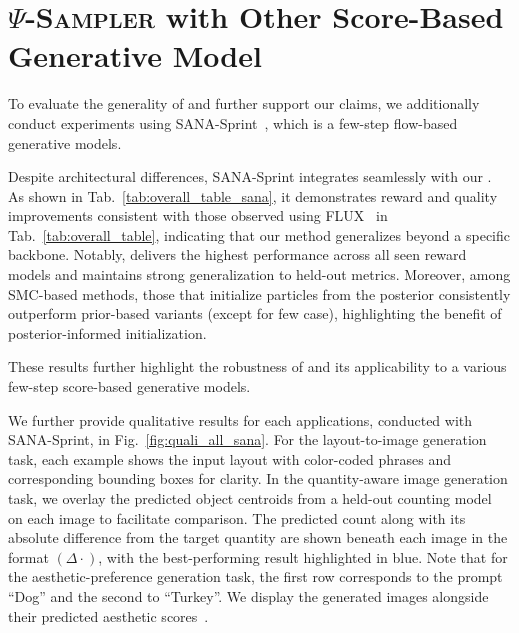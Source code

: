 \section{\textsc{$\Psi$-Sampler} with Other Score-Based Generative Model}
\label{sec:appx:sana}
To evaluate the generality of \methodname{} and further support our claims, we additionally conduct experiments using SANA-Sprint~\cite{chen2025sanasprint}, which is a few-step flow-based generative models.

Despite architectural differences, SANA-Sprint integrates seamlessly with our \methodname{}. As shown in Tab.~\ref{tab:overall_table_sana}, it demonstrates reward and quality improvements consistent with those observed using FLUX~\cite{BlackForestLabs:2024Flux} in Tab.~\ref{tab:overall_table}, indicating that our method generalizes beyond a specific backbone. Notably, \methodname{} delivers the highest performance across all seen reward models and maintains strong generalization to held-out metrics. Moreover, among SMC-based methods, those that initialize particles from the posterior consistently outperform prior-based variants (except for few case), highlighting the benefit of posterior-informed initialization.

These results further highlight the robustness of \methodname{} and its applicability to a various few-step score-based generative models.

We further provide qualitative results for each applications, conducted with SANA-Sprint, in Fig.~\ref{fig:quali_all_sana}. 
For the layout-to-image generation task, each example shows the input layout with color-coded phrases and corresponding bounding boxes for clarity.
In the quantity-aware image generation task, we overlay the predicted object centroids from a held-out counting model~\cite{AminiNaieni2024countgd} on each image to facilitate comparison. The predicted count along with its absolute difference from the target quantity are shown beneath each image in the format $(\Delta\cdot)$, with the best-performing result highlighted in blue.
Note that for the aesthetic-preference generation task, the first row corresponds to the prompt “Dog” and the second to “Turkey”. We display the generated images alongside their predicted aesthetic scores~\cite{schuhmann2022aesthetic}. 
\vspace{0.75cm}




